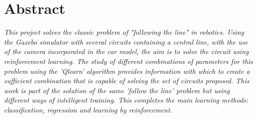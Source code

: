 \thispagestyle{plain}			%
\section*{Abstract}
\textit{This project solves the classic problem of "following the line" in robotics. Using the Gazebo simulator with several circuits containing a central line, with the use of the camera incorporated in the car model, the aim is to solve the circuit using reinforcement learning. The study of different combinations of parameters for this problem using the 'Qlearn' algorithm provides information with which to create a sufficient combination that is capable of solving the set of circuits proposed. This work is part of the solution of the same 'follow the line' problem but using different ways of intelligent training. This completes the main learning methods: classification, regression and learning by reinforcement.}


\newpage				%
\thispagestyle{empty}
\mbox{}